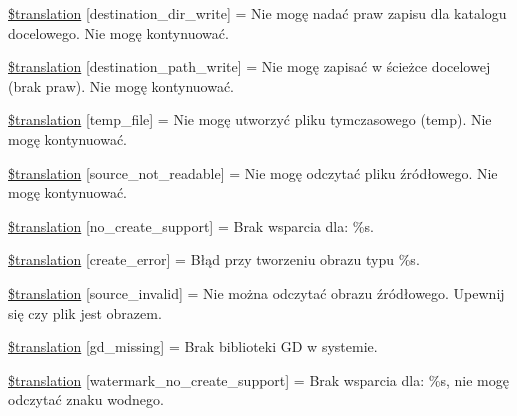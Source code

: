 \begin{DoxyCompactItemize}
\item 
\hyperlink{class_8upload_8pl___p_l_8php_a97608ea194a616db49141a0e6dee900c}{\$translation} \mbox{[}\textquotesingle{}destination\+\_\+dir\+\_\+write\textquotesingle{}\mbox{]} = \textquotesingle{}Nie mogę nadać praw zapisu dla katalogu docelowego. Nie mogę kontynuować.\textquotesingle{}
\item 
\hyperlink{class_8upload_8pl___p_l_8php_a40e4e1962226b89fd76da5819a9602b0}{\$translation} \mbox{[}\textquotesingle{}destination\+\_\+path\+\_\+write\textquotesingle{}\mbox{]} = \textquotesingle{}Nie mogę zapisać w ścieżce docelowej (brak praw). Nie mogę kontynuować.\textquotesingle{}
\item 
\hyperlink{class_8upload_8pl___p_l_8php_a2baece8da11e20d45175db91851ec3e3}{\$translation} \mbox{[}\textquotesingle{}temp\+\_\+file\textquotesingle{}\mbox{]} = \textquotesingle{}Nie mogę utworzyć pliku tymczasowego (temp). Nie mogę kontynuować.\textquotesingle{}
\item 
\hyperlink{class_8upload_8pl___p_l_8php_a922967ca2df0efdd455261142d8e5715}{\$translation} \mbox{[}\textquotesingle{}source\+\_\+not\+\_\+readable\textquotesingle{}\mbox{]} = \textquotesingle{}Nie mogę odczytać pliku źródłowego. Nie mogę kontynuować.\textquotesingle{}
\item 
\hyperlink{class_8upload_8pl___p_l_8php_a346dfd1ade29f583dd20d345c436859f}{\$translation} \mbox{[}\textquotesingle{}no\+\_\+create\+\_\+support\textquotesingle{}\mbox{]} = \textquotesingle{}Brak wsparcia dla\+: \%s.\textquotesingle{}
\item 
\hyperlink{class_8upload_8pl___p_l_8php_a53013ce9255c4e1849098ddd9fdb2b3f}{\$translation} \mbox{[}\textquotesingle{}create\+\_\+error\textquotesingle{}\mbox{]} = \textquotesingle{}Błąd przy tworzeniu obrazu typu \%s.\textquotesingle{}
\item 
\hyperlink{class_8upload_8pl___p_l_8php_a6ab0a660b457eaf2d3434b225449fdd6}{\$translation} \mbox{[}\textquotesingle{}source\+\_\+invalid\textquotesingle{}\mbox{]} = \textquotesingle{}Nie można odczytać obrazu źródłowego. Upewnij się czy plik jest obrazem.\textquotesingle{}
\item 
\hyperlink{class_8upload_8pl___p_l_8php_a7f3dfcc0db4bbc0f2e7210c439798e56}{\$translation} \mbox{[}\textquotesingle{}gd\+\_\+missing\textquotesingle{}\mbox{]} = \textquotesingle{}Brak biblioteki G\+D w systemie.\textquotesingle{}
\item 
\hyperlink{class_8upload_8pl___p_l_8php_a82d5853430ab72dc1f9799ec36144cc6}{\$translation} \mbox{[}\textquotesingle{}watermark\+\_\+no\+\_\+create\+\_\+support\textquotesingle{}\mbox{]} = \textquotesingle{}Brak wsparcia dla\+: \%s, nie mogę odczytać znaku wodnego.\textquotesingle{}

\end{DoxyCompactItemize}
